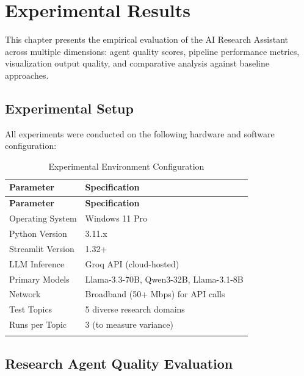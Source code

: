 \documentclass[a4paper,12pt,openany]{report}
\begin{document}

\chapter{Experimental Results}

This chapter presents the empirical evaluation of the AI Research Assistant across multiple dimensions: agent quality scores, pipeline performance metrics, visualization output quality, and comparative analysis against baseline approaches.

\section{Experimental Setup}

All experiments were conducted on the following hardware and software configuration:

\begin{longtable}{|p{4cm}|p{9.5cm}|}
\hline
\textbf{Parameter} & \textbf{Specification} \\
\hline
\endfirsthead
\hline
\textbf{Parameter} & \textbf{Specification} \\
\hline
\endhead
\hline
\endfoot
Operating System & Windows 11 Pro \\
\hline
Python Version & 3.11.x \\
\hline
Streamlit Version & 1.32+ \\
\hline
LLM Inference & Groq API (cloud-hosted) \\
\hline
Primary Models & Llama-3.3-70B, Qwen3-32B, Llama-3.1-8B \\
\hline
Network & Broadband (50+ Mbps) for API calls \\
\hline
Test Topics & 5 diverse research domains \\
\hline
Runs per Topic & 3 (to measure variance) \\
\hline

\caption{Experimental Environment Configuration}
\label{tab:exp_setup}
\end{longtable}

\section{Research Agent Quality Evaluation}
\end{document}

